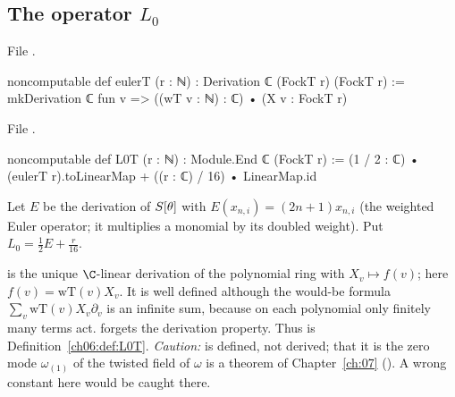 \subsection{The operator \texorpdfstring{$L_0$}{L0}}

\noindent File .
\begin{leancode}
noncomputable def eulerT (r : ℕ) : Derivation ℂ (FockT r) (FockT r) :=
  mkDerivation ℂ fun v => ((wT v : ℕ) : ℂ) • (X v : FockT r)
\end{leancode}
\noindent File .
\begin{leancode}
noncomputable def L0T (r : ℕ) : Module.End ℂ (FockT r) :=
  (1 / 2 : ℂ) • (eulerT r).toLinearMap + ((r : ℂ) / 16) • LinearMap.id
\end{leancode}
\begin{definition}\label{ch06:def:L0T}
Let $E$ be the derivation of $S[\theta]$ with $E(x_{n,i})=(2n+1)x_{n,i}$ (the weighted Euler
operator; it multiplies a monomial by its doubled weight).  Put $L_0=\frac12E+\frac r{16}$.
\end{definition}
\begin{dictionary}
 is the unique $\C$-linear derivation of the polynomial ring with
$X_v\mapsto f(v)$; here $f(v)=\mathrm{wT}(v)X_v$.  It is well defined although the would-be formula
$\sum_v\mathrm{wT}(v)X_v\partial_v$ is an infinite sum, because on each polynomial only finitely many
terms act.   forgets the derivation property.  Thus  is
Definition~\ref{ch06:def:L0T}.  \emph{Caution:}  is defined, not derived; that it is the
zero mode $\omega_{(1)}$ of the twisted field of $\omega$ is a theorem of Chapter~\ref{ch:07}
().  A wrong constant here would be caught there.
\end{dictionary}

